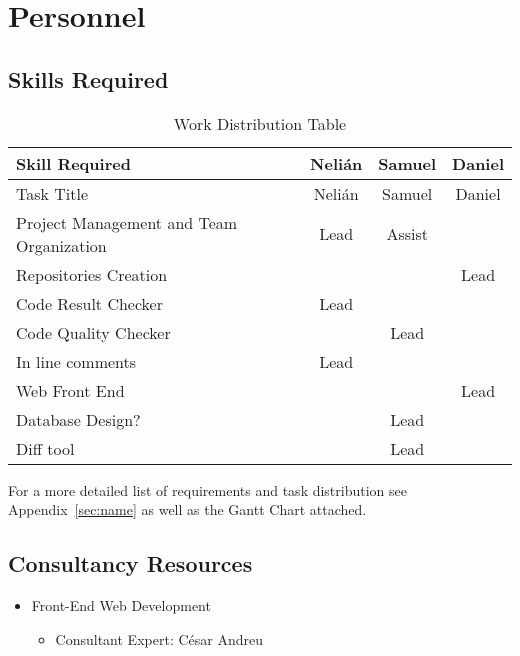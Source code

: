 \section{Personnel}

\subsection{Skills Required}
\begin{center}
\setlength{\extrarowheight}{1.5pt}
    \begin{longtable}{|m{3.25in}|c|c|c|}
 \caption{Work Distribution Table} \\
     \hline
    
    \centering Skill Required & Nelián & Samuel & Daniel \\
    \hline \hline \endfirsthead
    
         \hline

	\centering Task Title & Nelián & Samuel & Daniel \\    
	\hline \hline \endhead
    
    \endfoot    
    
    Project Management and Team Organization & Lead  & Assist &  \\ \hline
    Repositories Creation &       &       & Lead \\  \hline
    Code Result Checker & Lead  &       &  \\  \hline
    Code Quality Checker &       & Lead  &  \\  \hline
    In line comments & Lead  &       &  \\  \hline
    Web Front End &       &       & Lead \\  \hline
    Database Design? &       & Lead  &  \\  \hline
    Diff tool &       & Lead  &  \\  \hline
     \end{longtable}
\end{center}

For a more detailed list of requirements and task distribution see Appendix~\ref{sec:name} as well as the Gantt Chart attached.
\subsection{Consultancy Resources}
\begin{itemize}
\item Front-End Web Development
\begin{itemize}
\item Consultant Expert: César Andreu
\end{itemize}
\end{itemize}